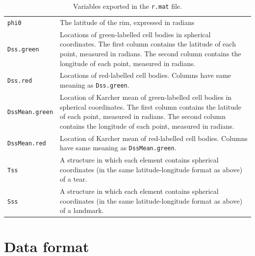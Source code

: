 \documentclass{article}
\begin{document}
\begin{table}
  \begin{tabularx}{\linewidth}{lX}
    \hline \texttt{phi0} & The latitude of the rim, expressed in
    radians
    \\
    \texttt{Dss.green} & Locations of green-labelled cell bodies in
    spherical coordinates. The first column contains the latitude of
    each point, measured in radians. The second column contains the
    longitude of each point, measured in radians. \\
    \texttt{Dss.red} & Locations of red-labelled cell
    bodies. Columns have same meaning as \texttt{Dss.green}. \\
    \texttt{DssMean.green} & Location of Karcher mean of
    green-labelled cell bodies in spherical coordinates. The first
    column contains the latitude of each point, measured in
    radians. The second column contains the
    longitude of each point, measured in radians. \\
    \texttt{DssMean.red} & Location of Karcher mean of red-labelled
    cell bodies. Columns have same meaning as \texttt{DssMean.green}. \\
    \texttt{Tss} & A structure in which each element contains
    spherical coordinates (in the same latitude-longitude format as
    above) of a tear. \\
    \texttt{Sss} & A structure in which each element contains
    spherical coordinates (in the same latitude-longitude format as
    above) of a landmark. \\
    \hline
  \end{tabularx}
  \caption{Variables exported in the \texttt{r.mat} file.}
  \label{tab:matlab-export}
\end{table}

\appendix

\section{Data format}
\label{manual:sec:reading-data}
\end{document}
